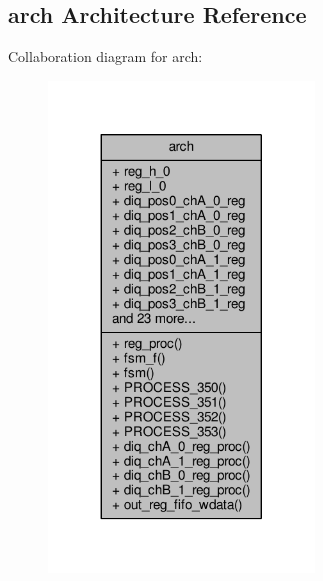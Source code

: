 \subsection{arch Architecture Reference}
\label{classrxiq__mimo__ddr_1_1arch}


Collaboration diagram for arch\+:\nopagebreak
\begin{figure}[H]
\begin{center}
\leavevmode
\includegraphics[width=200pt]{df/d98/classrxiq__mimo__ddr_1_1arch__coll__graph}
\end{center}
\end{figure}
